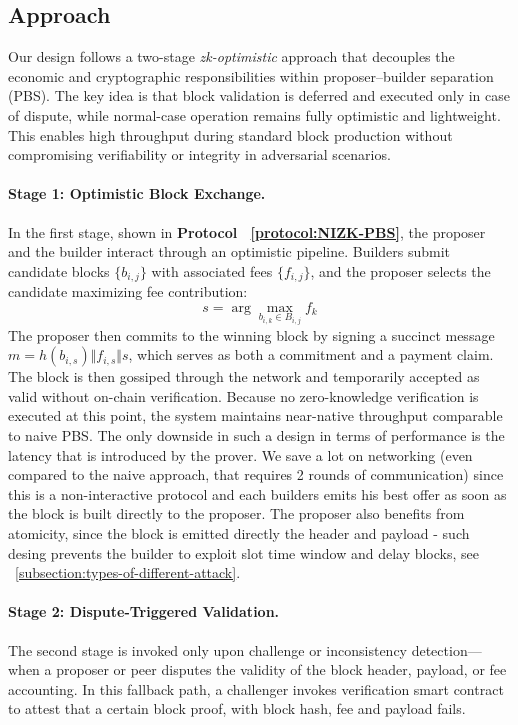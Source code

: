 \subsection{Approach}
\label{sec:approach}

Our design follows a two-stage \textit{zk-optimistic} approach that decouples the economic and cryptographic responsibilities within proposer–builder separation (PBS). The key idea is that block validation is deferred and executed only in case of dispute, while normal-case operation remains fully optimistic and lightweight. This enables high throughput during standard block production without compromising verifiability or integrity in adversarial scenarios.



\paragraph{Stage 1: Optimistic Block Exchange.}
In the first stage, shown in \textbf{Protocol ~\ref{protocol:NIZK-PBS}}, the proposer and the builder interact through an optimistic pipeline. Builders submit candidate blocks $\{b_{i,j}\}$ with associated fees $\{f_{i,j}\}$, and the proposer selects the candidate maximizing fee contribution:
\[
s = \arg\max_{b_{i,k} \in B_{i,j}} f_k
\]
The proposer then commits to the winning block by signing a succinct message
$m = h(b_{i,s}) \Vert f_{i,s} \Vert s$,
which serves as both a commitment and a payment claim. The block is then gossiped through the network and temporarily accepted as valid without on-chain verification. Because no zero-knowledge verification is executed at this point, the system maintains near-native throughput comparable to naive PBS. The only downside in such a design in terms of performance is the latency that is introduced by the prover. We save a lot on networking (even compared to the naive approach, that requires 2 rounds of communication) since this is a non-interactive protocol and each builders emits his best offer as soon as the block is built directly to the proposer. The proposer also benefits from atomicity, since the block is emitted directly the header and payload - such desing prevents the builder to exploit slot time window and delay blocks, see ~\ref{subsection:types-of-different-attack}.

\paragraph{Stage 2: Dispute-Triggered Validation.}
The second stage is invoked only upon challenge or inconsistency detection—when a proposer or peer disputes the validity of the block header, payload, or fee accounting. In this fallback path, a challenger invokes verification smart contract to attest that a certain block proof, with block hash, fee and payload fails.

